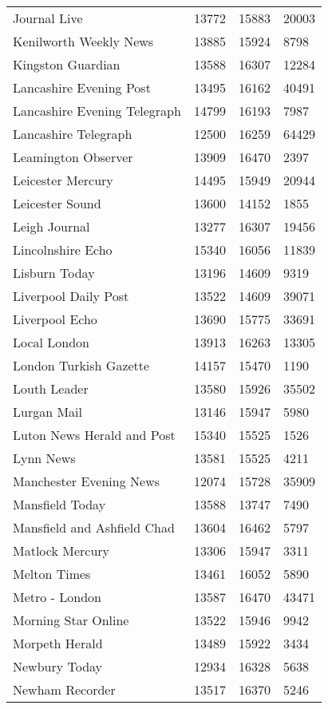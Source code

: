 \begin{longtable}{p{}p{}p{}p{}}
  Journal Live & 13772 & 15883 & 20003 \\ 
  Kenilworth Weekly News & 13885 & 15924 & 8798 \\ 
  Kingston Guardian & 13588 & 16307 & 12284 \\ 
  Lancashire Evening Post & 13495 & 16162 & 40491 \\ 
  Lancashire Evening Telegraph & 14799 & 16193 & 7987 \\ 
  Lancashire Telegraph & 12500 & 16259 & 64429 \\ 
  Leamington Observer & 13909 & 16470 & 2397 \\ 
  Leicester Mercury & 14495 & 15949 & 20944 \\ 
  Leicester Sound & 13600 & 14152 & 1855 \\ 
  Leigh Journal & 13277 & 16307 & 19456 \\ 
  Lincolnshire Echo & 15340 & 16056 & 11839 \\ 
  Lisburn Today & 13196 & 14609 & 9319 \\ 
  Liverpool Daily Post & 13522 & 14609 & 39071 \\ 
  Liverpool Echo & 13690 & 15775 & 33691 \\ 
  Local London & 13913 & 16263 & 13305 \\ 
  London Turkish Gazette & 14157 & 15470 & 1190 \\ 
  Louth Leader & 13580 & 15926 & 35502 \\ 
  Lurgan Mail & 13146 & 15947 & 5980 \\ 
  Luton News Herald and Post & 15340 & 15525 & 1526 \\ 
  Lynn News & 13581 & 15525 & 4211 \\ 
  Manchester Evening News & 12074 & 15728 & 35909 \\ 
  Mansfield Today & 13588 & 13747 & 7490 \\ 
  Mansfield and Ashfield Chad & 13604 & 16462 & 5797 \\ 
  Matlock Mercury & 13306 & 15947 & 3311 \\ 
  Melton Times & 13461 & 16052 & 5890 \\ 
  Metro - London & 13587 & 16470 & 43471 \\ 
  Morning Star Online & 13522 & 15946 & 9942 \\ 
  Morpeth Herald & 13489 & 15922 & 3434 \\ 
  Newbury Today & 12934 & 16328 & 5638 \\ 
  Newham Recorder & 13517 & 16370 & 5246 \\ 

\end{longtable}
